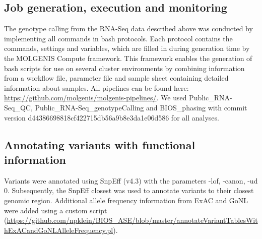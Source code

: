 {{\subsection{Job generation, execution and monitoring}
The genotype calling from the RNA-Seq data described above was conducted by implementing all commands in bash protocols. Each protocol contains the commands, settings and variables, which are filled in during generation time by the MOLGENIS Compute framework\cite{byelasMOLGENISBasedComputational2011}. This framework enables the generation of bash scripts for use on several cluster environments by combining information from a workflow file, parameter file and sample sheet containing detailed information about samples. All pipelines can be found here: \url{https://github.com/molgenis/molgenis-pipelines/}. We used Public\_RNA-Seq\_QC, Public\_RNA-Seq\_genotypeCalling and BIOS\_phasing with commit version d44386698818cf422715db56a9b8e3da1e06d586 for all analyses. 

\subsection{Annotating variants with functional information}
Variants were annotated using SnpEff\cite{cingolaniProgramAnnotatingPredicting2012} (v4.3) with the parameters -lof, -canon, -ud 0. Subsequently, the SnpEff closest was used to annotate variants to their closest genomic region. Additional allele frequency information from ExAC and GoNL were added using a custom script (\url{https://github.com/npklein/BIOS\_ASE/blob/master/annotateVariantTablesWithExACandGoNLAlleleFrequency.pl}).

}}

